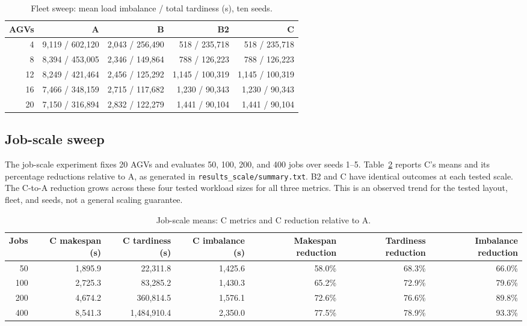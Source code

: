 \documentclass[11pt]{article}
\begin{document}
\begin{table}[htbp]
\centering
\small
\caption{Fleet sweep: mean load imbalance / total tardiness (s), ten seeds.}
\label{tab:fleet-sweep}
\begin{tabular}{rrrrr}
\toprule
AGVs & A & B & B2 & C \\
\midrule
4  & 9,119 / 602,120 & 2,043 / 256,490 & 518 / 235,718 & 518 / 235,718 \\
8  & 8,394 / 453,005 & 2,346 / 149,864 & 788 / 126,223 & 788 / 126,223 \\
12 & 8,249 / 421,464 & 2,456 / 125,292 & 1,145 / 100,319 & 1,145 / 100,319 \\
16 & 7,466 / 348,159 & 2,715 / 117,682 & 1,230 / 90,343 & 1,230 / 90,343 \\
20 & 7,150 / 316,894 & 2,832 / 122,279 & 1,441 / 90,104 & 1,441 / 90,104 \\
\bottomrule
\end{tabular}
\end{table}

\subsection{Job-scale sweep}

The job-scale experiment fixes 20 AGVs and evaluates 50, 100, 200, and 400
jobs over seeds 1--5. Table~\ref{tab:job-scale} reports C's means and its
percentage reductions relative to A, as generated in
\texttt{results\_scale/summary.txt}. B2 and C have identical outcomes at each
tested scale. The C-to-A reduction grows across these four tested workload
sizes for all three metrics. This is an observed trend for the tested layout,
fleet, and seeds, not a general scaling guarantee.

\begin{table}[htbp]
\centering
\scriptsize
\caption{Job-scale means: C metrics and C reduction relative to A.}
\label{tab:job-scale}
\begin{tabular}{rrrrrrr}
\toprule
Jobs & C makespan (s) & C tardiness (s) & C imbalance (s) & Makespan reduction & Tardiness reduction & Imbalance reduction \\
\midrule
50  & 1,895.9 & 22,311.8 & 1,425.6 & 58.0\% & 68.3\% & 66.0\% \\
100 & 2,725.3 & 83,285.2 & 1,430.3 & 65.2\% & 72.9\% & 79.6\% \\
200 & 4,674.2 & 360,814.5 & 1,576.1 & 72.6\% & 76.6\% & 89.8\% \\
400 & 8,541.3 & 1,484,910.4 & 2,350.0 & 77.5\% & 78.9\% & 93.3\% \\
\bottomrule
\end{tabular}
\end{table}
\end{document}
